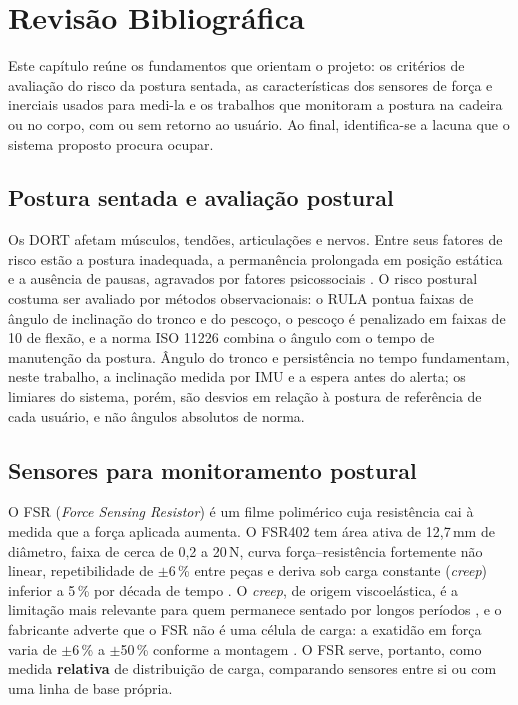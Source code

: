 \chapter{Revisão Bibliográfica}\label{cap:fund_teorica}

Este capítulo reúne os fundamentos que orientam o projeto: os critérios de
avaliação do risco da postura sentada, as características dos sensores de
força e inerciais usados para medi-la e os trabalhos que monitoram a postura
na cadeira ou no corpo, com ou sem retorno ao usuário. Ao final, identifica-se
a lacuna que o sistema proposto procura ocupar.

\section{Postura sentada e avaliação postural}
\label{sec:rev-ergonomia}

Os DORT afetam músculos, tendões, articulações e nervos. Entre seus fatores de
risco estão a postura inadequada, a permanência prolongada em posição estática
e a ausência de pausas, agravados por fatores psicossociais
\cite{mohammadian2025}. O risco postural costuma ser avaliado por métodos
observacionais: o RULA \cite{mcatamney1993} pontua faixas de ângulo de
inclinação do tronco e do pescoço, o pescoço é penalizado em faixas de
10\degree{} de flexão, e a norma ISO 11226 \cite{iso11226} combina o ângulo
com o tempo de manutenção da postura. Ângulo do tronco e persistência
no tempo fundamentam, neste trabalho, a inclinação medida por IMU e a espera
antes do alerta; os limiares do sistema, porém, são desvios em relação à
postura de referência de cada usuário, e não ângulos absolutos de norma.

\section{Sensores para monitoramento postural}
\label{sec:rev-sensores}

O FSR (\emph{Force Sensing Resistor}) é um filme polimérico cuja resistência cai à medida que a força aplicada aumenta. O FSR402 tem área ativa
de 12{,}7\,mm de diâmetro, faixa de cerca de 0{,}2 a 20\,N, curva
força--resistência fortemente não linear, repetibilidade de $\pm$6\,\% entre
peças e deriva sob carga constante (\emph{creep}) inferior a 5\,\% por década
de tempo \cite{interlink_datasheet}. O \emph{creep}, de origem viscoelástica, é
a limitação mais relevante para quem permanece sentado por longos períodos
\cite{paredesmadrid2017}, e o fabricante adverte que o FSR não é uma célula de
carga: a exatidão em força varia de $\pm$6\,\% a $\pm$50\,\% conforme a
montagem \cite{interlink_guia}. O FSR serve, portanto, como medida
\textbf{relativa} de distribuição de carga, comparando sensores entre si ou com
uma linha de base própria.

